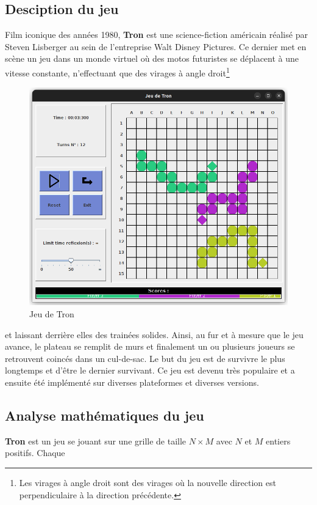 \tocless\subsection{Desciption du jeu}
Film iconique des années 1980, \textbf{Tron} est une science-fiction américain réalisé par
Steven Lisberger au sein de l'entreprise Walt Disney Pictures. Ce dernier met en scène un jeu dans 
un monde virtuel où des motos futuristes se déplacent à une vitesse constante, n'effectuant que des 
virages à angle droit\footnote{Les virages à angle droit sont des virages où la nouvelle direction 
est perpendiculaire à la direction précédente.} 
\begin{figure}[h!]
	\centering
	\includegraphics[scale=0.35]{Images/jeu-tron.png}
	\caption{Jeu de Tron}
	\label{fig:jeu-tron}
\end{figure}
et laissant derrière elles des trainées solides. Ainsi,
au fur et à mesure que le jeu avance, le plateau se remplit de murs et finalement un ou plusieurs
joueurs se retrouvent coincés dans un cul-de-sac. Le but du jeu est de survivre le plus longtemps et 
d'être le dernier survivant. Ce jeu est devenu très populaire et a ensuite été implémenté sur diverses
plateformes et diverses versions.\\
\tocless\subsection{Analyse mathématiques du jeu}
\textbf{Tron} est un jeu se jouant sur une grille de taille $N\times M$ avec $N$ et $M$ entiers positifs. Chaque 
